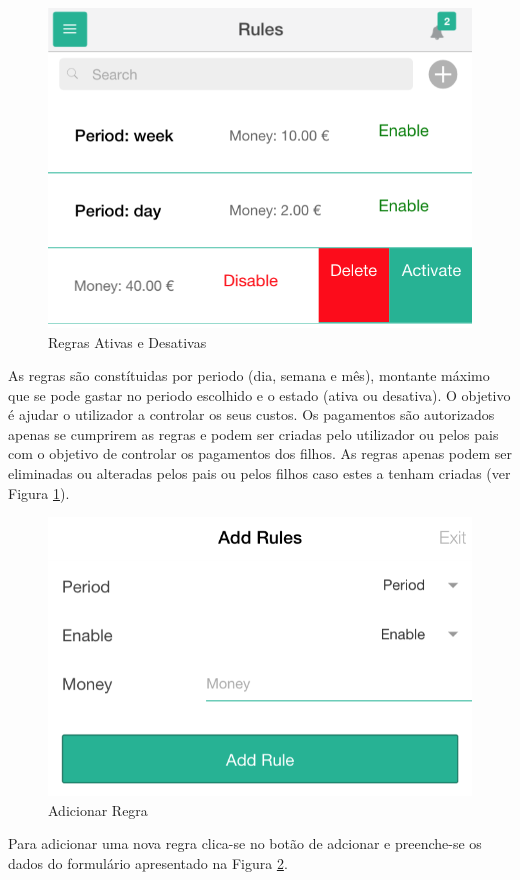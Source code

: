 \begin{figure}[H]
	\begin{center}
		\includegraphics[width=0.5
		\textwidth]{rules/rules.png}
	\end{center}
	\caption{Regras Ativas e Desativas}
	\label{fig:8}
\end{figure}

As regras são constítuidas por periodo (dia, semana e mês), montante máximo que se pode gastar no periodo escolhido e o estado (ativa ou desativa). O objetivo é ajudar o utilizador a controlar os seus custos. Os pagamentos são autorizados apenas se cumprirem as regras e podem ser criadas pelo utilizador ou pelos pais com o objetivo de controlar os pagamentos dos filhos. As regras apenas podem ser eliminadas ou alteradas pelos pais ou pelos filhos caso estes a tenham criadas (ver Figura \ref{fig:8}).

\begin{figure}[H]
	\begin{center}
		\includegraphics[width=0.5
		\textwidth]{rules/addRule.png}
	\end{center}
	\caption{Adicionar Regra}
	\label{fig:8_1}
\end{figure}

Para adicionar uma nova regra clica-se no botão de adcionar e preenche-se os dados do formulário apresentado na Figura \ref{fig:8_1}.